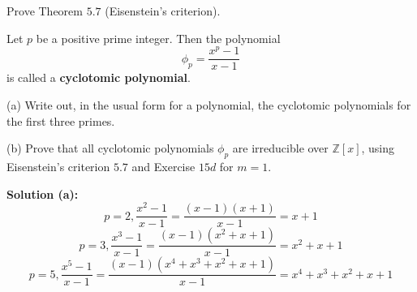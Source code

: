\begin{tcolorbox}[title=Problem 16, breakable]
    Prove Theorem $5.7$ (Eisenstein's criterion).
\end{tcolorbox}

\begin{tcolorbox}[title=Problem 17, breakable]
    Let $p$ be a positive prime integer. Then the polynomial
    \[\phi_p = \frac{x^p - 1}{x - 1}\]
    is called a \textbf{cyclotomic polynomial}.

    (a) Write out, in the usual form for a polynomial, the cyclotomic
        polynomials for the first three primes.

    (b) Prove that all cyclotomic polynomials $\phi_p$ are irreducible
        over $\mathbb{Z}[x]$, using Eisenstein's criterion $5.7$ 
        and Exercise $15d$ for $m = 1$.
\end{tcolorbox}

\textbf{Solution (a):}
\[p = 2, \frac{x^2 - 1}{x - 1} = \frac{(x - 1)(x + 1)}{x - 1} = x + 1\]
\[p = 3, \frac{x^3 - 1}{x - 1} = \frac{(x - 1)(x^2 + x + 1)}{x - 1} = x^2 + x + 1\]
\[p = 5, \frac{x^5 - 1}{x - 1} = \frac{(x - 1)(x^4 + x^3 + x^2 + x + 1)}{x - 1} = x^4 + x^3 + x^2 + x + 1\]
